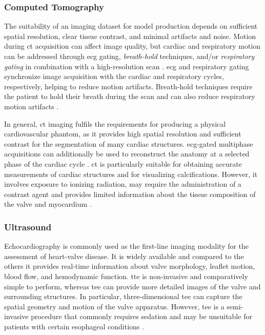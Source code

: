 \subsubsection{Computed Tomography}\label{subsubsec:computed_tomography}
The suitability of an imaging dataset for model production depends on sufficient spatial resolution, clear tissue contrast, and minimal artifacts and noise. Motion during \gls{ct} acquisition can affect image quality, but cardiac and respiratory motion can be addressed through \gls{ecg} gating, \emph{breath-hold} techniques, and/or \emph{respiratory gating} in combination with a high-resolution scan \cite{tuncay20193d}. \Gls{ecg} and respiratory gating synchronize image acquisition with the cardiac and respiratory cycles, respectively, helping to reduce motion artifacts. Breath-hold techniques require the patient to hold their breath during the scan and can also reduce respiratory motion artifacts \cite{giraud2013respiratory}. 

In general, \gls{ct} imaging fulfils the requirements for producing a physical cardiovascular phantom, as it provides high spatial resolution and sufficient contrast for the segmentation of many cardiac structures. \Gls{ecg}-gated multiphase acquisitions can additionally be used to reconstruct the anatomy at a selected phase of the cardiac cycle \cite{tuncay20193d}. \Gls{ct} is particularly suitable for obtaining accurate measurements of cardiac structures and for visualizing calcifications. However, it involves exposure to ionizing radiation, may require the administration of a contrast agent \cite{zheng2021application} and provides limited information about the tissue composition of the valve and myocardium \cite{tuncay20193d}.

\subsubsection{Ultrasound}\label{subsubsec:ultrasound}
Echocardiography is commonly used as the first-line imaging modality for the assessment of heart-valve disease. It is widely available and compared to the others it provides real-time information about valve morphology, leaflet motion, blood flow, and hemodynamic function. \Gls{tte} is non-invasive and comparatively simple to perform, whereas \gls{tee} can provide more detailed images of the valve and surrounding structures. In particular, three-dimensional \gls{tee} can capture the spatial geometry and motion of the valve apparatus. However, \gls{tee} is a semi-invasive procedure that commonly requires sedation and may be unsuitable for patients with certain esophageal conditions \cite{zheng2021application}.

